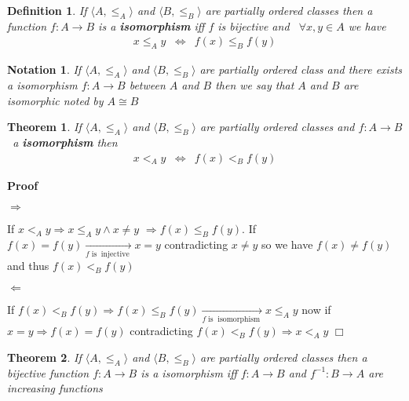 \documentclass{book}
\newcommand{\Rightarrowlim}{\mathop{\rightarrow}\limits}
\newcommand{\tmop}[1]{\ensuremath{\operatorname{#1}}}
\newcommand{\tmtextbf}[1]{{\bfseries{#1}}}
\newenvironment{proof}{\noindent\textbf{Proof\ }}{\hspace*{\fill}$\Box$\medskip}
\newtheorem{definition}{Definition}
{\theorembodyfont{\rmfamily}\newtheorem{example}{Example}}
\newtheorem{notation}{Notation}
{\theorembodyfont{\rmfamily}\newtheorem{note}{Note}}
\newtheorem{theorem}{Theorem}
\begin{document}
{{\begin{definition}
  {}\label{isomorphism}If $\langle A, \leqslant_A \rangle$
  and $\langle B, \leqslant_B \rangle$ are partially ordered classes then a
  function $f : A \rightarrow B$ is a \tmtextbf{isomorphism} iff $f$ is
  bijective and \ $\forall x, y \in A$ we have
  \begin{eqnarray*}
    x \leqslant_A y & \Leftrightarrow & f (x) \leqslant_B f (y)
  \end{eqnarray*}
\end{definition}

\begin{notation}
  \label{isomorph classes}{}{\index{$\cong$}}If $\langle
  A, \leqslant_A \rangle$ and $\langle B, \leqslant_B \rangle$ are partially
  ordered class and there exists a isomorphism $f : A \rightarrow B$ between
  $A$ and $B$ then we say that $A$ and $B$ are isomorphic noted by $A \cong B$
\end{notation}

\begin{theorem}
  \label{isomorphism is strictly increasing}If $\langle A, \leqslant_A
  \rangle$ and $\langle B, \leqslant_B \rangle$ are partially ordered classes
  and $f : A \rightarrow B$ \ a \tmtextbf{isomorphism} then
  \begin{eqnarray*}
    x <_A y & \Leftrightarrow & f (x) <_B f (y)
  \end{eqnarray*}
\end{theorem}

\begin{proof}
  
  
  $\Rightarrow$
  
  If $x <_A y \Rightarrow x \leqslant_A y \wedge x \neq y$ $\Rightarrow f (x)
  \leqslant_B f (y)$. If $f (x) = f (y) \Rightarrowlim_{f \tmop{is}
  \tmop{injective}} x = y$ contradicting $x \neq y$ so we have $f (x) \neq f
  (y)$ and thus $f (x) <_B f (y)$
  
  $\Leftarrow$
  
  If $f (x) <_B f (y) \Rightarrow f (x) \leqslant_B f (y) \Rightarrowlim_{f
  \tmop{is} \tmop{isomorphism}} x \leqslant_A y$ now if $x = y \Rightarrow f
  (x) = f (y)$ contradicting $f (x) <_B f (y) \Rightarrow x <_A y$
\end{proof}

\begin{theorem}
  \label{condition for bijection to be isomorph}If $\langle A, \leqslant_A
  \rangle$ and $\langle B, \leqslant_B \rangle$ are partially ordered classes
  then a bijective function $f : A \rightarrow B$ is a isomorphism iff $f : A
  \rightarrow B$ and $f^{- 1} : B \rightarrow A$ are increasing functions
\end{theorem}

}}
\end{document}
